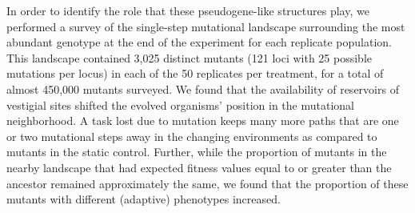 \documentclass[letterpaper]{article}
\begin{document}
In order to identify the role that these pseudogene-like structures play, we performed a survey of the single-step mutational landscape surrounding the
most abundant genotype at the end of the experiment for
each replicate population. This landscape contained 
3,025 distinct mutants (121 loci with 25 possible mutations per locus) in each of the 50 replicates per treatment, for a total of almost 450,000 mutants surveyed.
We found that the availability of reservoirs of vestigial sites shifted the evolved organisms'%
position in the mutational neighborhood. %
A task lost due to mutation keeps many more paths that are one or two mutational steps away in the changing environments as compared to mutants in the static control.
Further, while the proportion of mutants in the nearby landscape that had expected fitness values equal to or greater than the ancestor
remained approximately the same, we found that the proportion of these mutants with different (adaptive) phenotypes increased.
\end{document}
